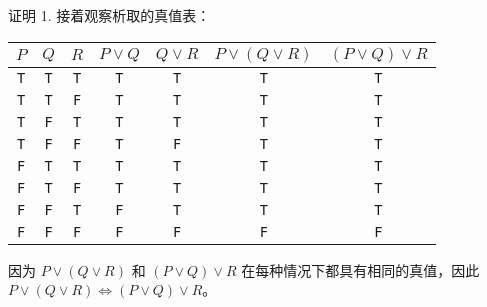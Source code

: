 \begin{proofs}{证明 1. }
    接着观察析取的真值表：
    \begin{center}
        \begin{tabular}{c|c|c|c|c|c|c}
              $P$    & $Q$   & $R$ & $P \lor Q$ &  $Q \lor R$  & $P \lor (Q \lor R)$ & $(P \lor Q) \lor R$ \\
              \hline
              \verb|T| & \verb|T| & \verb|T| &  \verb|T|  &    \verb|T|    &\verb|T| &    \verb|T|    \\
              \verb|T| & \verb|T| & \verb|F| &  \verb|T|  &    \verb|T|    &\verb|T| &    \verb|T|    \\
              \verb|T| & \verb|F| & \verb|T| &  \verb|T|  &    \verb|T|    &\verb|T| &    \verb|T|    \\
              \verb|T| & \verb|F| & \verb|F| &  \verb|T|  &    \verb|F|    &\verb|T| &    \verb|T|    \\
              \verb|F| & \verb|T| & \verb|T| &  \verb|T|  &    \verb|T|    &\verb|T| &    \verb|T|    \\
              \verb|F| & \verb|T| & \verb|F| &  \verb|T|  &    \verb|T|    &\verb|T| &    \verb|T|    \\
              \verb|F| & \verb|F| & \verb|T| &  \verb|F|  &    \verb|T|    &\verb|T| &    \verb|T|    \\
              \verb|F| & \verb|F| & \verb|F| &  \verb|F|  &    \verb|F|    &\verb|F| &    \verb|F|    \\
        \end{tabular}
    \end{center}

    因为 $P \lor (Q \lor R)$ 和 $(P \lor Q) \lor R$ 在每种情况下都具有相同的真值，因此 $P \lor (Q \lor R) \iff (P \lor Q) \lor R$。
\end{proofs}

